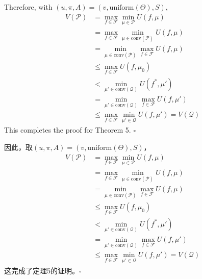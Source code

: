 \documentclass[12pt,a4paper]{article}
\newenvironment{original}
  {\par\vspace{4pt}\noindent\color{black}\ignorespaces}
  {\par\vspace{2pt}}
\newenvironment{translation}
  {\par\vspace{2pt}\noindent\color{myblue}\ignorespaces}
  {\par\vspace{6pt}}
\newcommand{\calF}{\mathcal{F}}
\newcommand{\conv}{\mathrm{conv}}
\begin{document}
\begin{original}
Therefore, with $(u,\pi,A)=(v,\text{uniform}(\Theta),S)$,
\begin{align}
    V(\mathcal{P}) &= \max_{f\in\calF} \min_{\mu\in\mathcal{P}} U(f, \mu) \nonumber\\
                   &= \max_{f\in\calF} \min_{\mu\in\conv(\mathcal{P})} U(f, \mu) \nonumber\\
                   &= \min_{\mu\in\conv(\mathcal{P})} \max_{f\in\calF} U(f, \mu) \nonumber\\
                   &\leq \max_{f\in\calF} U(f, \mu_0) \nonumber\\
                   &< \min_{\mu'\in\conv(\mathcal{Q})} U(f^*, \mu') \nonumber\\
                   &= \min_{\mu'\in\conv(\mathcal{Q})} \max_{f\in\calF} U(f, \mu') \nonumber\\
                   &\leq \max_{f\in\calF} \min_{\mu'\in\mathcal{Q}} U(f, \mu') = V(\mathcal{Q})
\end{align}
This completes the proof for Theorem 5. $\square$
\end{original}

\begin{translation}
因此，取$(u,\pi,A)=(v,\text{uniform}(\Theta),S)$，
\begin{align}
    V(\mathcal{P}) &= \max_{f\in\calF} \min_{\mu\in\mathcal{P}} U(f, \mu) \nonumber\\
                   &= \max_{f\in\calF} \min_{\mu\in\conv(\mathcal{P})} U(f, \mu) \nonumber\\
                   &= \min_{\mu\in\conv(\mathcal{P})} \max_{f\in\calF} U(f, \mu) \nonumber\\
                   &\leq \max_{f\in\calF} U(f, \mu_0) \nonumber\\
                   &< \min_{\mu'\in\conv(\mathcal{Q})} U(f^*, \mu') \nonumber\\
                   &= \min_{\mu'\in\conv(\mathcal{Q})} \max_{f\in\calF} U(f, \mu') \nonumber\\
                   &\leq \max_{f\in\calF} \min_{\mu'\in\mathcal{Q}} U(f, \mu') = V(\mathcal{Q})
\end{align}
这完成了定理5的证明。$\square$
\end{translation}

\end{document}
